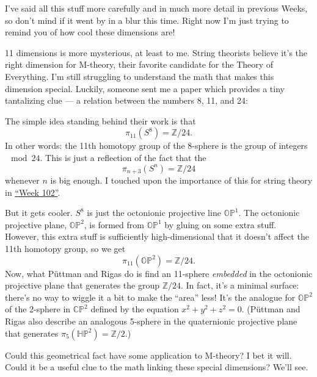 \documentclass{article}
\def\tightlist{}
\renewcommand{\texttt}[1]{%
  \begingroup
  \ttfamily
  \begingroup\lccode`~=`/\lowercase{\endgroup\def~}{/\discretionary{}{}{}}%
  \begingroup\lccode`~=`[\lowercase{\endgroup\def~}{[\discretionary{}{}{}}%
  \begingroup\lccode`~=`.\lowercase{\endgroup\def~}{.\discretionary{}{}{}}%
  \catcode`/=\active\catcode`[=\active\catcode`.=\active
  \scantokens{#1\noexpand}%
  \endgroup
}
\begin{document}
I've said all this stuff more carefully and in much more detail in
previous Weeks, so don't mind if it went by in a blur this time. Right
now I'm just trying to remind you of how cool these dimensions are!

11 dimensions is more mysterious, at least to me. String theorists
believe it's the right dimension for M-theory, their favorite candidate
for the Theory of Everything. I'm still struggling to understand the
math that makes this dimension special. Luckily, someone sent me a paper
which provides a tiny tantalizing clue --- a relation between the
numbers 8, 11, and 24:


The simple idea standing behind their work is that
\[\pi_{11}(S^8) = \mathbb{Z}/24.\] In other words: the 11th homotopy
group of the 8-sphere is the group of integers \(\mod 24\). This is just
a reflection of the fact that the \[\pi_{n+3}(S^n) = \mathbb{Z}/24\]
whenever \(n\) is big enough. I touched upon the importance of this for
string theory in \protect\hyperlink{week102}{``Week 102''}.

But it gets cooler. \(S^8\) is just the octonionic projective line
\(\mathbb{OP}^1\). The octonionic projective plane, \(\mathbb{OP}^2\),
is formed from \(\mathbb{OP}^1\) by gluing on some extra stuff. However,
this extra stuff is sufficiently high-dimensional that it doesn't affect
the 11th homotopy group, so we get
\[\pi_{11}(\mathbb{OP}^2) = \mathbb{Z}/24.\] Now, what Püttman and Rigas
do is find an 11-sphere \emph{embedded} in the octonionic projective
plane that generates the group \(\mathbb{Z}/24\). In fact, it's a
minimal surface: there's no way to wiggle it a bit to make the ``area''
less! It's the analogue for \(\mathbb{OP}^2\) of the 2-sphere in
\(\mathbb{CP}^2\) defined by the equation \(x^2 + y^2 + z^2 = 0\).
(Püttman and Rigas also describe an analogous 5-sphere in the
quaternionic projective plane that generates
\(\pi_5(\mathbb{HP}^2) = \mathbb{Z}/2\).)

Could this geometrical fact have some application to M-theory? I bet it
will. Could it be a useful clue to the math linking these special
dimensions? We'll see.
\end{document}
